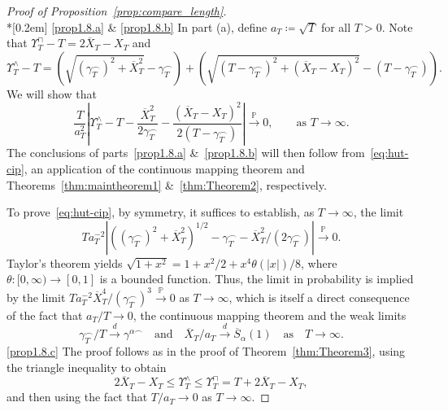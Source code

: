\documentclass[AHL,Unicode,longabstracts,published]{cedram}
\newcommand\p{\mathds{P}}
\newcommand\1{\mathds{1}}
\newcommand\cid{\xrightarrow{d}}
\newcommand\cip{\xrightarrow{\p}}
\newcommand\ov[1]{\overline{#1}}
\begin{document}
\begin{proof}[Proof of Proposition~\ref{prop:compare_length}]\ \\*[0.2em]
\eqref{prop1.8.a} \& \eqref{prop1.8.b} In part (a), define $a_T\coloneqq\sqrt{T}$ for all $T>0$. Note that $\Upsilon^\sqcap_T-T=2\ov{X}_T-X_T$ and
\[
\Upsilon^\wedge_T-T =\left(\sqrt{\left(\gamma^\frown_T\right)^2 + \ov{X}_T^2}-\gamma^\frown_T\right) +\left(\sqrt{\left(T-\gamma^\frown_T\right)^2 + \left(\ov{X}_T-X_T\right)^2} -\left(T-\gamma^\frown_T\right)\right).
\]
We will show that
\begin{equation}\label{eq:hut-cip}
\frac{T}{a_T^2}\left|\Upsilon_T^\wedge-T- \frac{\ov X_T^2}{2\gamma_T^\frown}-\frac{\left(\ov X_T-X_T\right)^2}{2\left(T-\gamma_T^\frown\right)}\right|
\cip 0,\qquad \text{as }T\to\infty.
\end{equation}
The conclusions of parts~\eqref{prop1.8.a} \&~\eqref{prop1.8.b} will then follow from~\eqref{eq:hut-cip}, an application of the continuous mapping theorem and Theorems~\ref{thm:maintheorem1} \&~\ref{thm:Theorem2}, respectively.

To prove~\eqref{eq:hut-cip}, by symmetry, it suffices to establish, as $T\to\infty$, the limit
\[
Ta_T^{-2}\left|\left(\left(\gamma^\frown_T\right)^2 + \ov{X}_T^2\right)^{1/2}-\gamma^\frown_T - \ov{X}_T^2/\left(2\gamma^\frown_T\right)\right|\cip 0.
\]
Taylor's theorem yields $\sqrt{1+x^2}=1+x^2/2+x^4\theta(|x|)/8$, where $\theta:[0,\infty)\to[0,1]$ is a bounded function. Thus, the limit in probability is implied by the limit $Ta_T^{-2}\ov{X}_T^4/(\gamma^\frown_T)^3\cip 0$ as $T\to\infty$, which is itself a direct consequence of the fact that $a_T/T\to 0$, the continuous mapping theorem and the weak limits 
\[
\gamma^\frown_T/T\cid \gamma^{\alpha\frown}\quad\text{and}\quad \ov{X}_T/a_T\cid \ov{S}_\alpha(1)\quad\text{as}\quad T \to \infty.
\]
\eqref{prop1.8.c} The proof follows as in the proof of Theorem~\ref{thm:Theorem3}, using the triangle inequality to obtain
\[
2\ov{X}_T-X_T
\le\Upsilon^\wedge_T
\le\Upsilon^\sqcap_T =T+2\ov{X}_T-X_T,
\]
and then using the fact that $T/a_T\to 0$ as $T \to \infty$.
\end{proof}





\end{document}
